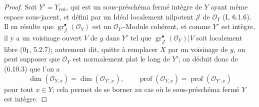 \begin{proof}
Soit $Y'=Y_{\mathrm{red}}$, qui est un sous-préschéma fermé intègre de $Y$
ayant même espace sous-jacent, et défini par un Idéal localement nilpotent
$\mathcal J$ de $\mathcal O_Y$ (I, 6.1.6). Il en résulte que
$\operatorname{gr}_{\mathcal J}^{\bullet}(\mathcal O_Y)$ est un
$\mathcal O_{Y'}$-Module cohérent, et comme $Y'$ est intègre, il y a un
voisinage ouvert $V$ de $y$ dans $Y'$ tel que
$\operatorname{gr}_{\mathcal J}^{\bullet}(\mathcal O_Y)|V$ soit localement
libre (0$_{\rm I}$, 5.2.7); autrement dit, quitte à remplacer $X$ par un
voisinage de $y$, on peut supposer que $\mathcal O_Y$ est normalement plat
le long de $Y'$; on déduit donc de (6.10.3) que l'on a
\[
\dim(\mathcal O_{Y,x})=\dim(\mathcal O_{Y',x}),\qquad
\operatorname{prof}(\mathcal O_{Y,x})=
\operatorname{prof}(\mathcal O_{Y',x})
\]
pour tout $x\in Y$; cela permet de se borner au cas où le sous-préschéma
fermé $Y$ est intègre.


\end{proof}
